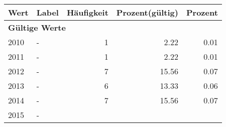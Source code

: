      \begin{longtable}{lXrrr}
     \toprule
     \textbf{Wert} & \textbf{Label} & \textbf{Häufigkeit} & \textbf{Prozent(gültig)} & \textbf{Prozent} \\
     \endhead
     \midrule
     \multicolumn{5}{l}{\textbf{Gültige Werte}}\\

     2010 &
     \multicolumn{1}{X}{ -  } &


       \num{1} &
       \num[round-mode=places,round-precision=2]{2.22} &
         \num[round-mode=places,round-precision=2]{0.01} \\

     2011 &
     \multicolumn{1}{X}{ -  } &


       \num{1} &
       \num[round-mode=places,round-precision=2]{2.22} &
         \num[round-mode=places,round-precision=2]{0.01} \\

     2012 &
     \multicolumn{1}{X}{ -  } &


       \num{7} &
       \num[round-mode=places,round-precision=2]{15.56} &
         \num[round-mode=places,round-precision=2]{0.07} \\

     2013 &
     \multicolumn{1}{X}{ -  } &


       \num{6} &
       \num[round-mode=places,round-precision=2]{13.33} &
         \num[round-mode=places,round-precision=2]{0.06} \\

     2014 &
     \multicolumn{1}{X}{ -  } &


       \num{7} &
       \num[round-mode=places,round-precision=2]{15.56} &
         \num[round-mode=places,round-precision=2]{0.07} \\

     2015 &
     \multicolumn{1}{X}{ -  } &



\end{longtable}
